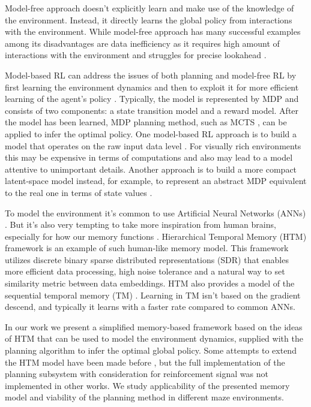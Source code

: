 \documentclass[a4paper,twoside]{article}
\begin{document}
Model-free approach doesn't explicitly learn and make use of the knowledge of the environment. Instead, it directly learns the global policy from interactions with the environment. While model-free approach has many successful examples among its disadvantages are data inefficiency as it requires high amount of interactions with the environment and struggles for precise lookahead \cite{Mnih_2015_Atari,haarnoja_2018_sac,schulman_2017_ppo}.

Model-based RL can address the issues of both planning and model-free RL by first learning the environment dynamics and then to exploit it for more efficient learning of the agent's policy \cite{moerland_2020_modelbased}. Typically, the model is represented by MDP and consists of two components: a state transition model and a reward model. After the model has been learned, MDP planning method, such as MCTS \cite{Coulom_2007_mcts}, can be applied to infer the optimal policy. One model-based RL approach is to build a model that operates on the raw input data level \cite{Gorodetskiy2020,kaiser_2020_modelbased}. For visually rich environments this may be expensive in terms of computations and also may lead to a model attentive to unimportant details. Another approach is to build a more compact latent-space model instead, for example, to represent an abstract MDP equivalent to the real one in terms of state values \cite{silver_2020_muzero}.

To model the environment it's common to use Artificial Neural Networks (ANNs) \cite{silver_2020_muzero,Ha_Schmidhuber_2018_worldmodels}. But it's also very tempting to take more inspiration from human brains, especially for how our memory functions \cite{Hassabis_2017_neuro}. Hierarchical Temporal Memory (HTM) framework \cite{George_Hawkins_2009} is an example of such human-like memory model. This framework utilizes discrete binary sparse distributed representations (SDR) \cite{Cui_Ahmad_Hawkins_2017_sdr} that enables more efficient data processing, high noise tolerance and a natural way to set similarity metric between data embeddings. HTM also provides a model of the sequential temporal memory (TM) \cite{hawkins_TM}. Learning in TM isn't based on the gradient descend, and typically it learns with a faster rate compared to common ANNs.

In our work we present a simplified memory-based framework based on the ideas of HTM that can be used to model the environment dynamics, supplied with the planning algorithm to infer the optimal global policy. Some attempts to extend the HTM model have been made before \cite{Skrynnik2016,Daylidyonok2018,Nugamanov2020}, but the full implementation of the planning subsystem with consideration for reinforcement signal was not implemented in other works. We study applicability of the presented memory model and viability of the planning method in different maze environments.
\end{document}
